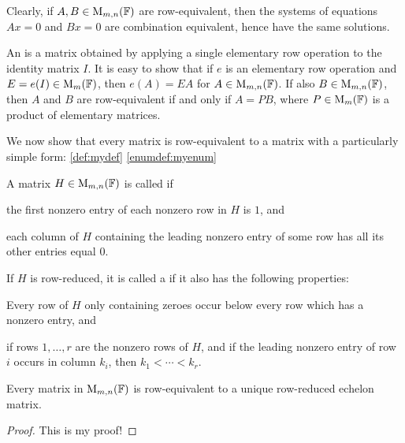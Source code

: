 Clearly, if $A, B \in \mathrm{M}_{m,n}(\mathbb{F})$ are row-equivalent, then the systems of equations $Ax = 0$ and $Bx = 0$ are combination equivalent, hence have the same solutions.

An  is a matrix obtained by applying a single elementary row operation to the identity matrix $I$. It is easy to show that if $e$ is an elementary row operation and $E = e(I) \in \mathrm{M}_{m}(\mathbb{F})$, then $e(A) = EA$ for $A \in \mathrm{M}_{m,n}(\mathbb{F})$. If also $B \in \mathrm{M}_{m,n}(\mathbb{F})$, then $A$ and $B$ are row-equivalent if and only if $A = PB$, where $P \in \mathrm{M}_{m}(\mathbb{F})$ is a product of elementary matrices.

We now show that every matrix is row-equivalent to a matrix with a particularly simple form: \cref{def:mydef} \cref{enumdef:myenum} 

\begin{definition}\label{def:mydef}
    A matrix $H \in \mathrm{M}_{m,n}(\mathbb{F})$ is called  if
    \begin{enumdefinition}
        \item \label{enumdef:myenum} the first nonzero entry of each nonzero row in $H$ is $1$, and
        \item each column of $H$ containing the leading nonzero entry of some row has all its other entries equal $0$.
    \end{enumdefinition}
    If $H$ is row-reduced, it is called a  if it also has the following properties:
    \begin{enumdefinition}[resume]
        \item Every row of $H$ only containing zeroes occur below every row which has a nonzero entry, and
        \item if rows $1, \ldots, r$ are the nonzero rows of $H$, and if the leading nonzero entry of row $i$ occurs in column $k_i$, then $k_1 < \cdots < k_r$.
    \end{enumdefinition}
\end{definition}

\begin{proposition}[My proposition]
    Every matrix in $\mathrm{M}_{m,n}(\mathbb{F})$ is row-equivalent to a unique row-reduced echelon matrix.
\end{proposition}

\begin{proof}
    This is my proof!
\end{proof}

